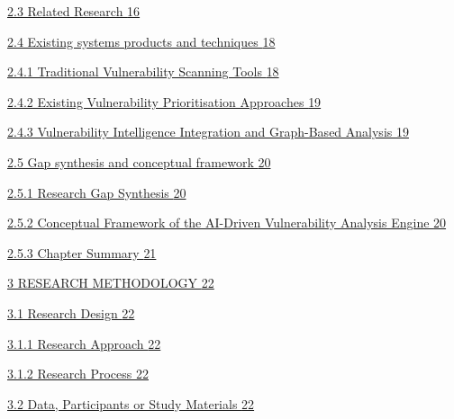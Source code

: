 \documentclass[
]{article}
\begin{document}
\protect\hyperlink{related-research}{2.3 Related Research
\protect\hyperlink{related-research}{16}}

\protect\hyperlink{existing-systems-products-and-techniques}{2.4
Existing systems products and techniques
\protect\hyperlink{existing-systems-products-and-techniques}{18}}

\protect\hyperlink{traditional-vulnerability-scanning-tools}{2.4.1
Traditional Vulnerability Scanning Tools
\protect\hyperlink{traditional-vulnerability-scanning-tools}{18}}

\protect\hyperlink{existing-vulnerability-prioritisation-approaches}{2.4.2
Existing Vulnerability Prioritisation Approaches
\protect\hyperlink{existing-vulnerability-prioritisation-approaches}{19}}

\protect\hyperlink{vulnerability-intelligence-integration-and-graph-based-analysis}{2.4.3
Vulnerability Intelligence Integration and Graph-Based Analysis
\protect\hyperlink{vulnerability-intelligence-integration-and-graph-based-analysis}{19}}

\protect\hyperlink{gap-synthesis-and-conceptual-framework}{2.5 Gap
synthesis and conceptual framework
\protect\hyperlink{gap-synthesis-and-conceptual-framework}{20}}

\protect\hyperlink{research-gap-synthesis}{2.5.1 Research Gap Synthesis
\protect\hyperlink{research-gap-synthesis}{20}}

\protect\hyperlink{conceptual-framework-of-the-ai-driven-vulnerability-analysis-engine}{2.5.2
Conceptual Framework of the AI-Driven Vulnerability Analysis Engine
\protect\hyperlink{conceptual-framework-of-the-ai-driven-vulnerability-analysis-engine}{20}}

\protect\hyperlink{chapter-summary}{2.5.3 Chapter Summary
\protect\hyperlink{chapter-summary}{21}}

\protect\hyperlink{research-methodology}{3 RESEARCH METHODOLOGY
\protect\hyperlink{research-methodology}{22}}

\protect\hyperlink{research-design}{3.1 Research Design
\protect\hyperlink{research-design}{22}}

\protect\hyperlink{research-approach}{3.1.1 Research Approach
\protect\hyperlink{research-approach}{22}}

\protect\hyperlink{research-process}{3.1.2 Research Process
\protect\hyperlink{research-process}{22}}

\protect\hyperlink{data-participants-or-study-materials}{3.2 Data,
Participants or Study Materials
\protect\hyperlink{data-participants-or-study-materials}{22}}
\end{document}

